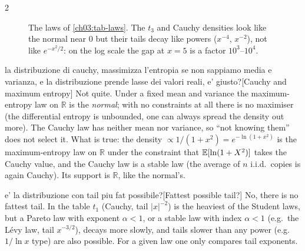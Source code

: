 \begin{paracol}{2}
\begin{figure}[!htb]
\hfill
{}
\caption{The laws of \cref{ch03:tab-laws}. The $t_3$ and Cauchy densities look like the normal near $0$ but
their tails decay like powers ($x^{-4}$, $x^{-2}$), not like $e^{-x^2/2}$: on the log scale the gap at $x=5$ is a
factor $10^3$--$10^4$.}\label{ch03:fig-laws}
\end{figure}
\begin{answer}{la distribuzione di cauchy, massimizza l'entropia se non sappiamo media e varianza, e la distribuzione prende lasse dei valori reali, e' giusto?}[Cauchy and maximum entropy]
Not quite. Under a fixed mean and variance the maximum-entropy law on $\mathbb R$ is the \emph{normal}; with no constraints at all
there is no maximiser (the differential entropy is unbounded, one can always spread the density out more). The Cauchy law has
neither mean nor variance, so ``not knowing them'' does not select it. What is true: the density $\propto1/(1+x^2)=e^{-\ln(1+x^2)}$
is the maximum-entropy law on $\mathbb R$ under the constraint that $\mathbb{E}[\ln(1+X^2)]$ takes the Cauchy value, and the Cauchy
law is a stable law (the average of $n$ i.i.d.\ copies is again Cauchy). Its support is $\mathbb R$, like the normal's.
\end{answer}
\begin{answer}{e' la distribuzione con tail piu fat possibile?}[Fattest possible tail?]
No, there is no fattest tail. In the table $t_1$ (Cauchy, tail $|x|^{-2}$) is the heaviest of the Student laws, but a Pareto law
with exponent $\alpha<1$, or a stable law with index $\alpha<1$ (e.g.\ the L\'evy law, tail $x^{-3/2}$), decays more slowly, and
tails slower than any power (e.g.\ $1/\ln x$ type) are also possible. For a given law one only compares tail exponents.
\end{answer}


\end{paracol}
